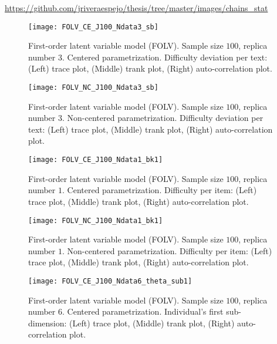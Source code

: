 \noindent \url{https://github.com/jriveraespejo/thesis/tree/master/images/chains_stat}
%
\begin{figure}[H]
	\centering
	\texttt{[image: FOLV\_CE\_J100\_Ndata3\_sb]}
	\caption[First-order latent variable model (FOLV). Sample size $100$, replica number $3$. Centered parametrization. Difficulty deviation per text. Trace, trank and auto-correlation plots.]%
	{First-order latent variable model (FOLV). Sample size $100$, replica number $3$. Centered parametrization. Difficulty deviation per text: (Left) trace plot, (Middle) trank plot, (Right) auto-correlation plot.}
	\label{fig:FOLV_CE_chains2}
\end{figure}
%
\begin{figure}[H]
	\centering
	\texttt{[image: FOLV\_NC\_J100\_Ndata3\_sb]}
	\caption[First-order latent variable model (FOLV). Sample size $100$, replica number $3$. Non-centered parametrization. Difficulty deviation per text. Trace, trank and auto-correlation plots.]%
	{First-order latent variable model (FOLV). Sample size $100$, replica number $3$. Non-centered parametrization. Difficulty deviation per text: (Left) trace plot, (Middle) trank plot, (Right) auto-correlation plot.}
	\label{fig:FOLV_NC_chains2}
\end{figure}
%
\begin{figure}[H]
	\centering
	\texttt{[image: FOLV\_CE\_J100\_Ndata1\_bk1]}
	\caption[First-order latent variable model (FOLV). Sample size $100$, replica number $1$. Centered parametrization. Difficulty per item. Trace, trank and auto-correlation plots.]%
	{First-order latent variable model (FOLV). Sample size $100$, replica number $1$. Centered parametrization. Difficulty per item: (Left) trace plot, (Middle) trank plot, (Right) auto-correlation plot.}
	\label{fig:FOLV_CE_chains3}
\end{figure}
%
\begin{figure}[H]
	\centering
	\texttt{[image: FOLV\_NC\_J100\_Ndata1\_bk1]}
	\caption[First-order latent variable model (FOLV). Sample size $100$, replica number $1$. Non-centered parametrization. Difficulty per item. Trace, trank and auto-correlation plots.]%
	{First-order latent variable model (FOLV). Sample size $100$, replica number $1$. Non-centered parametrization. Difficulty per item: (Left) trace plot, (Middle) trank plot, (Right) auto-correlation plot.}
	\label{fig:FOLV_NC_chains3}
\end{figure}
%
\begin{figure}[H]
	\centering
	\texttt{[image: FOLV\_CE\_J100\_Ndata6\_theta\_sub1]}
	\caption[First-order latent variable model (FOLV). Sample size $100$, replica number $6$. Centered parametrization. Individual's first sub-dimension. Trace, trank and auto-correlation plots.]%
	{First-order latent variable model (FOLV). Sample size $100$, replica number $6$. Centered parametrization. Individual's first sub-dimension: (Left) trace plot, (Middle) trank plot, (Right) auto-correlation plot.}
	\label{fig:FOLV_CE_chains4}
\end{figure}
